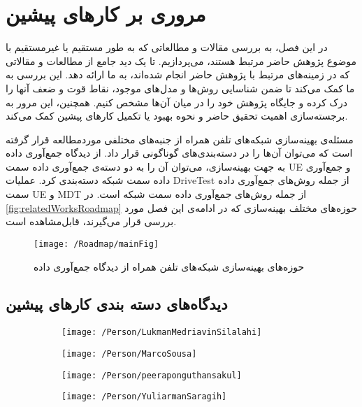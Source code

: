 \chapter{مروری بر کارهای پیشین}
\label{chap:relatedworks}
در این فصل، به بررسی مقالات و مطالعاتی که به طور مستقیم یا غیرمستقیم با موضوع پژوهش حاضر مرتبط هستند، می‌پردازیم. تا یک دید جامع از مطالعات و مقالاتی که در زمینه‌های مرتبط با پژوهش حاضر انجام شده‌اند، به ما ارائه دهد. این بررسی به ما کمک می‌کند تا ضمن شناسایی روش‌ها و مدل‌های موجود، نقاط قوت و ضعف آنها را درک کرده و جایگاه پژوهش خود را در میان آن‌ها مشخص کنیم. همچنین، این مرور به برجسته‌سازی اهمیت تحقیق حاضر و نحوه بهبود یا تکمیل کارهای پیشین کمک می‌کند.

مسئله‌ی بهینه‌سازی شبکه‌های تلفن همراه از جنبه‌های مختلفی موردمطالعه قرار گرفته است که می‌توان آن‌ها را در دسته‌بندی‌های گوناگونی قرار داد. از دیدگاه جمع‌آوری داده به جهت بهینه‌سازی، می‌توان آن را به دو دسته‌ی جمع‌آوری داده سمت 
\gls{UE} 
و جمع‌آوری داده سمت شبکه دسته‌بندی کرد. عملیات  \gls{DriveTest} از جمله روش‌های جمع‌آوری داده سمت \gls{UE} و \gls{MDT} از جمله روش‌های جمع‌آوری داده سمت شبکه است. در 
\autoref{fig:relatedWorksRoadmap}
حوزه‌های مختلف بهینه‌سازی که در ادامه‌ی این فصل مورد بررسی قرار می‌گیرند، قابل‌مشاهده است. 

\begin{figure}
\texttt{[image: /Roadmap/mainFig]}
\caption{%
حوزه‌های بهینه‌سازی شبکه‌های تلفن همراه از دیدگاه جمع‌آوری داده}
\label{fig:relatedWorksRoadmap}
\end{figure}

\ptext[3]


\section{دیدگاه‌های دسته بندی کارهای پیشین}
\begin{figure}
\begin{subfigure}[b]{.24\textwidth}\centering
\texttt{[image: /Person/LukmanMedriavinSilalahi]}
\caption{}
\end{subfigure} 
\begin{subfigure}[b]{.24\linewidth}\centering
\texttt{[image: /Person/MarcoSousa]}
\caption{}
\end{subfigure}
\begin{subfigure}[b]{.24\linewidth}\centering
\texttt{[image: /Person/peeraponguthansakul]}
\caption{}
\end{subfigure}
\begin{subfigure}[b]{.24\linewidth}\centering
\texttt{[image: /Person/YuliarmanSaragih]}
\caption{}
\end{subfigure}
\end{figure}

